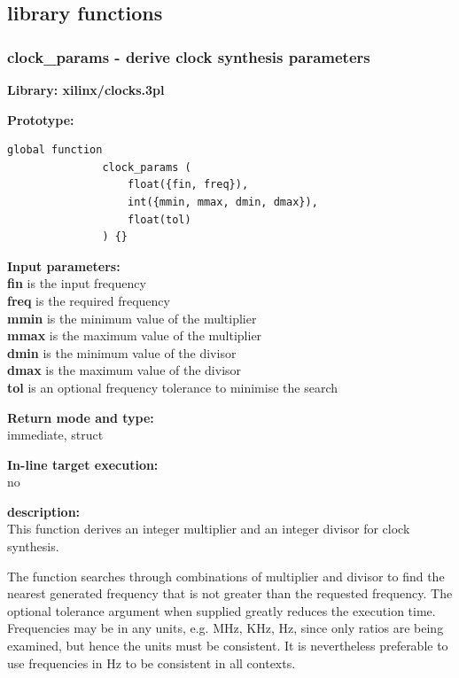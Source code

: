     \subsection{library functions}

        \subsubsection{clock\_params - derive clock synthesis parameters}\label{sec:lfclockparams}
            
            {\bf Library: xilinx/clocks.3pl}

            {\bf Prototype:} \\
            \vsp
            \begin{lstlisting}[gobble=12, language=threepl]
               global function
               clock_params (
                   float({fin, freq}),
                   int({mmin, mmax, dmin, dmax}),
                   float(tol)
               ) {}
            \end{lstlisting}

            {\bf Input parameters:} \\            
            {\bf fin} is the input frequency \\
            {\bf freq} is the required frequency \\
            {\bf mmin} is the minimum value of the multiplier \\
            {\bf mmax} is the maximum value of the multiplier \\
            {\bf dmin} is the minimum value of the divisor \\
            {\bf dmax} is the maximum value of the divisor \\
            {\bf tol} is an optional frequency tolerance to minimise the search

            {\bf Return mode and type:} \\
            immediate, struct
        
            {\bf In-line target execution:} \\
            no

            {\bf description:} \\
            This function derives an integer multiplier and an integer divisor
            for clock synthesis.

            The function searches through combinations of multiplier and divisor
            to find the nearest generated frequency that is not greater than the
            requested frequency. The optional tolerance argument when supplied
            greatly reduces the execution time. Frequencies may be in any units,
            e.g. MHz, KHz, Hz, since only ratios are being examined, but hence the
            units must be consistent. It is nevertheless preferable to use
            frequencies in Hz to be consistent in all contexts.
            
